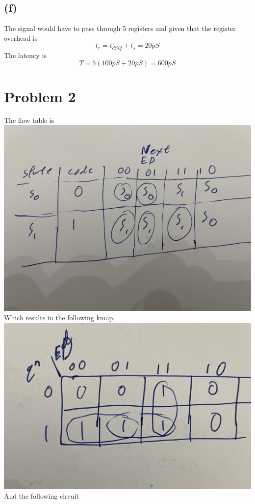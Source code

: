 \documentclass[12pt]{article}
\begin{document}
\subsection*{(f)}
The signal would have to pass through 5 registers and given that the register overhead is 
$$t_{r}=t_{dCQ}+t_s=20pS$$
The latency is 
$$T=5(100pS+20pS)=\boxed{600pS}$$
\section*{Problem 2}
The flow table is 
\includegraphics[scale=0.2]{Fig6.jpg}
Which results in the following kmap, \\
\includegraphics[scale=0.2]{Fig3.jpg}\\
And the following circuit\\
\end{document}
